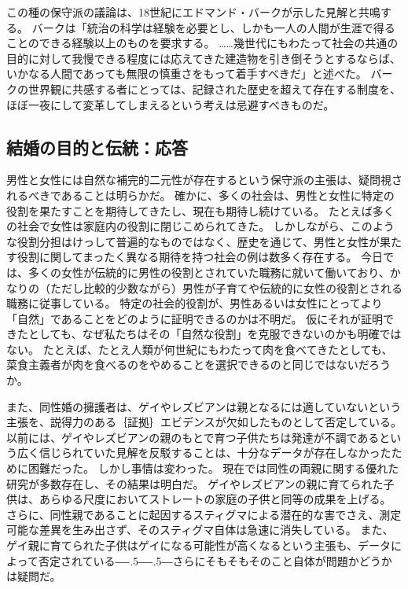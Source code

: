 \documentclass[paper=a4,book,openany]{jlreq}
\def\DDASH{―\kern-.5\zw―\kern-.5\zw―} %
\begin{document}
この種の保守派の議論は、18世紀にエドマンド・バークが示した見解と共鳴する。
バークは「統治の科学は経験を必要とし、しかも一人の人間が生涯で得ることのできる経験以上のものを要求する。
……幾世代にもわたって社会の共通の目的に対して我慢できる程度には応えてきた建造物を引き倒そうとするならば、いかなる人間であっても無限の慎重さをもって着手すべきだ」と述べた\citep[p.53]{burke87:_reflec_revol_franc}。
バークの世界観に共感する者にとっては、記録された歴史を超えて存在する制度を、ほぼ一夜にして変革してしまえるという考えは忌避すべきものだ。

\subsection{結婚の目的と伝統：応答}

男性と女性には自然な補完的二元性が存在するという保守派の主張は、疑問視されるべきであることは明らかだ。
確かに、多くの社会は、男性と女性に特定の役割を果たすことを期待してきたし、現在も期待し続けている。
たとえば多くの社会で女性は家庭内の役割に閉じこめられてきた。
しかしながら、このような役割分担はけっして普遍的なものではなく、歴史を通じて、男性と女性が果たす役割に関してまったく異なる期待を持つ社会の例は数多く存在する。
今日では、多くの女性が伝統的に男性の役割とされていた職務に就いて働いており、かなりの（ただし比較的少数ながら）男性が子育てや伝統的に女性の役割とされる職務に従事している。
特定の社会的役割が、男性あるいは女性にとってより「自然」であることをどのように証明できるのかは不明だ。
仮にそれが証明できたとしても、なぜ私たちはその「自然な役割」を克服できないのかも明確ではない。
たとえば、たとえ人類が何世紀にもわたって肉を食べてきたとしても、菜食主義者が肉を食べるのをやめることを選択できるのと同じではないだろうか。

また、同性婚の擁護者は、ゲイやレズビアンは親となるには適していないという主張を、説得力のある｛証拠｝{エビデンス}が欠如したものとして否定している。
以前には、ゲイやレズビアンの親のもとで育つ子供たちは発達が不調であるという広く信じられていた見解を反駁することは、十分なデータが存在しなかったために困難だった。
しかし事情は変わった。
現在では同性の両親に関する優れた研究が多数存在し、その結果は明白だ。
ゲイやレズビアンの親に育てられた子供は、あらゆる尺度においてストレートの家庭の子供と同等の成果を上げる。
さらに、同性親であることに起因するスティグマによる潜在的な害でさえ、測定可能な差異を生み出さず、そのスティグマ自体は急速に消失している\citep{calzo17:_paren_sexual_orien_child_psych_well_being,biblarz10:_how_does_gender_paren_matter}。
また、ゲイ親に育てられた子供はゲイになる可能性が高くなるという主張も、データによって否定されている{\DDASH}さらにそもそもそのこと自体が問題かどうかは疑問だ。
\end{document}
